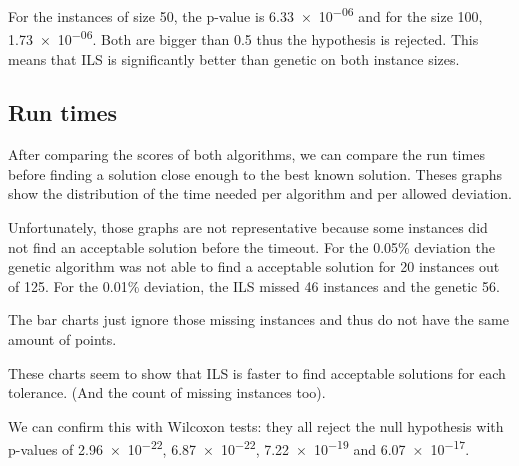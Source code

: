 \documentclass[a4paper]{article}
\begin{document}
For the instances of size 50, the p-value is \num{6.33e-06} and for the size 100, \num{1.73e-06}. Both are bigger than 0.5 thus the hypothesis is rejected. This means that ILS is significantly better than genetic on both instance sizes.

\subsection{Run times}

After comparing the scores of both algorithms, we can compare the run times before finding a solution close enough to the best known solution. Theses graphs show the distribution of the time needed per algorithm and per allowed deviation.

Unfortunately, those graphs are not representative because some instances did not find an acceptable solution before the timeout. For the 0.05\% deviation the genetic algorithm was not able to find a acceptable solution for 20 instances out of 125. For the 0.01\% deviation, the ILS missed 46 instances and the genetic 56.

The bar charts just ignore those missing instances and thus do not have the same amount of points.

These charts seem to show that ILS is faster to find acceptable solutions for each tolerance. (And the count of missing instances too).

We can confirm this with Wilcoxon tests: they all reject the null hypothesis with p-values of \num{2.96e-22}, \num{6.87e-22}, \num{7.22e-19} and \num{6.07e-17}.
\end{document}
